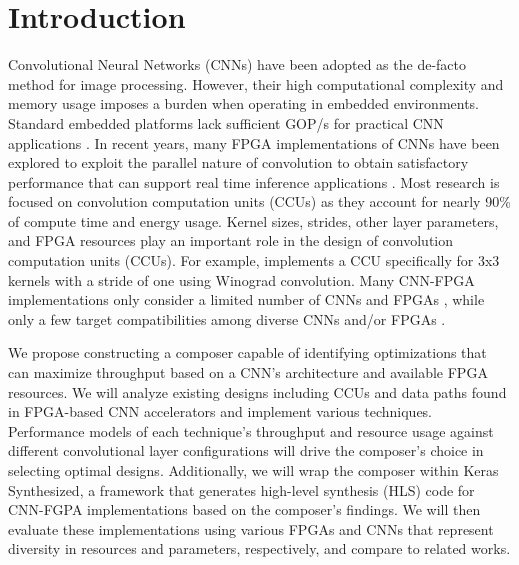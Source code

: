 \chapter {Introduction}
 
Convolutional Neural Networks (CNNs) have been adopted as the de-facto method for image processing. However, their high computational complexity and memory usage imposes a burden when operating in embedded environments. Standard embedded platforms lack sufficient GOP/s for practical CNN applications \cite{guo2018angel}. In recent years, many FPGA implementations of CNNs have been explored to exploit the parallel nature of convolution to obtain satisfactory performance that can support real time inference applications \cite{toledo2012fpga}. Most research is focused on convolution computation units (CCUs) as they account for nearly 90\% of compute time and energy usage. Kernel sizes, strides, other layer parameters, and FPGA resources play an important role in the design of convolution computation units (CCUs). For example, \cite{dicecco2016caffeinated} implements a CCU specifically for 3x3 kernels with a stride of one using Winograd convolution. Many CNN-FPGA implementations only consider a limited number of CNNs and FPGAs \cite{liu2016automatic, toledo2012fpga, hwang2017efficient, bettoni2017convolutional, jiao2017accelerating}, while only a few target compatibilities among diverse CNNs and/or FPGAs \cite{tu2017deep, dicecco2016caffeinated, lu2017evaluating}.

We propose constructing a composer capable of identifying optimizations that can maximize throughput based on a CNN’s architecture and available FPGA resources. We will analyze existing designs including CCUs and data paths found in FPGA-based CNN accelerators and implement various techniques. Performance models of each technique’s throughput and resource usage against different convolutional layer configurations will drive the composer’s choice in selecting optimal designs. Additionally, we will wrap the composer within Keras Synthesized, a framework that generates high-level synthesis (HLS) code for CNN-FGPA implementations based on the composer’s findings. We will then evaluate these implementations using various FPGAs and CNNs that represent diversity in resources and parameters, respectively, and compare to related works.